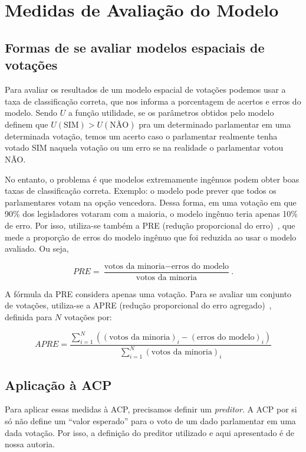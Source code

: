 \documentclass[
	article,			%
	12pt,				%
	oneside,			%
	a4paper,			%
	english,			%
	brazil,				%
	sumario=tradicional,
	oldfontcommands %
	]{abntex2}
\newcommand\nay{NÃO\xspace}
\newcommand\yea{SIM\xspace}
\begin{document}
\section{Medidas de Avaliação do Modelo}
\label{sec:avaliacao}

\subsection{Formas de se avaliar modelos espaciais de votações}

Para avaliar os resultados de um modelo espacial de votações podemos usar a taxa de classificação correta, que nos informa a porcentagem de acertos e erros do modelo. Sendo $U$ a função utilidade, se os parâmetros obtidos pelo modelo definem que $U(\textrm{SIM}) > U(\textrm{NÃO})$ pra um determinado parlamentar em uma determinada votação, temos um acerto caso o parlamentar realmente tenha votado \yea naquela votação ou um erro se na realidade o parlamentar votou \nay.

No entanto, o problema é que modelos extremamente ingênuos podem obter boas taxas de classificação correta. Exemplo: o modelo pode prever que todos os parlamentares votam na opção vencedora. Dessa forma, em uma votação em que 90\% dos legisladores votaram com a maioria, o modelo ingênuo teria apenas 10\% de erro. Por isso, utiliza-se também a PRE (redução proporcional do erro)~\cite{leoni02cdep}, que mede a proporção de erros do modelo ingênuo que foi reduzida ao usar o modelo avaliado. Ou seja,

\[PRE = \frac{\textrm{votos da minoria} - \textrm{erros do modelo}}{\textrm{votos da minoria}}.\]

A fórmula da PRE considera apenas uma votação. Para se avaliar um conjunto de votações, utiliza-se a APRE (redução proporcional do erro agregado)~\cite{leoni02cdep}, definida para $N$ votações por:

\[APRE = \frac{\sum_{i=1}^{N}\left(\left(\textrm{votos da minoria}\right)_i-\left(\textrm{erros do modelo}\right)_i\right)}{\sum_{i=1}^{N}\left(\textrm{votos da minoria}\right)_i}\]

\subsection{Aplicação à ACP}
\label{sec:avaliacao_acp}

Para aplicar essas medidas à ACP, precisamos definir um \emph{preditor}. A ACP por si só não define um ``valor esperado'' para o voto de um dado parlamentar em uma dada votação. Por isso, a definição do preditor utilizado e aqui apresentado é de nossa autoria.
\end{document}
